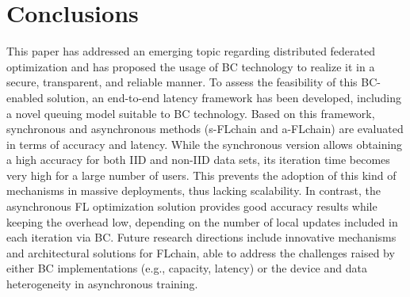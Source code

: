 \documentclass[10pt,journal,compsoc]{IEEEtran}
\begin{document}
\section{Conclusions}
\label{section:conclusions}
This paper has addressed an emerging topic regarding distributed federated optimization and has proposed the usage of BC technology to realize it in a secure, transparent, and reliable manner. To assess the feasibility of this BC-enabled solution, an end-to-end latency framework has been developed, including a novel queuing model suitable to BC technology. Based on this framework, synchronous and asynchronous methods (s-FLchain and a-FLchain) are evaluated in terms of accuracy and latency. While the synchronous version allows obtaining a high accuracy for both IID and non-IID data sets, its iteration time becomes very high for a large number of users. This prevents the adoption of this kind of mechanisms in massive deployments, thus lacking scalability. In contrast, the asynchronous FL optimization solution provides good accuracy results while keeping the overhead low, depending on the number of local updates included in each iteration via BC. Future research directions include innovative mechanisms and architectural solutions for FLchain, able to address the challenges raised by either BC implementations (e.g., capacity, latency) or the device and data heterogeneity in asynchronous training.




%
\end{document}
